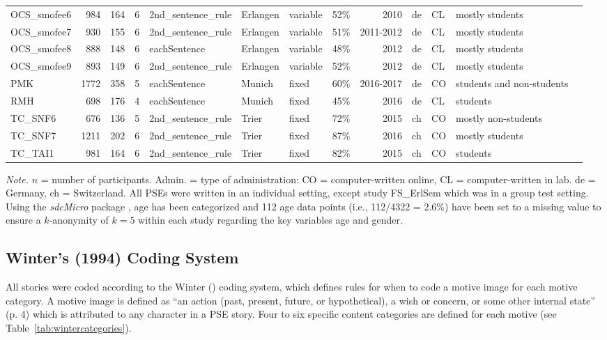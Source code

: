 \documentclass[man,a4paper,mask]{apa6}\usepackage[]{graphicx}\usepackage[]{color}
\begin{document}
\begin{table}
\begin{threeparttable}
\begin{tabularx}{\textwidth}{lrrrlllrrllll}
  OCS\_smofee6 & 984 & 164 &   6 & 2nd\_sentence\_rule & Erlangen & variable & 52\% & 2010 & de & CL & mostly students \\ 
  OCS\_smofee7 & 930 & 155 &   6 & 2nd\_sentence\_rule & Erlangen & variable & 51\% & 2011-2012 & de & CL & mostly students \\ 
  OCS\_smofee8 & 888 & 148 &   6 & eachSentence & Erlangen & variable & 48\% & 2012 & de & CL & mostly students \\ 
  OCS\_smofee9 & 893 & 149 &   6 & 2nd\_sentence\_rule & Erlangen & variable & 52\% & 2012 & de & CL & mostly students \\ 
  PMK & 1772 & 358 &   5 & eachSentence & Munich & fixed & 60\% & 2016-2017 & de & CO & students and non-students \\ 
  RMH & 698 & 176 &   4 & eachSentence & Munich & fixed & 45\% & 2016 & de & CL & students \\ 
  TC\_SNF6 & 676 & 136 &   5 & 2nd\_sentence\_rule & Trier & fixed & 72\% & 2015 & ch & CO & mostly non-students \\ 
  TC\_SNF7 & 1211 & 202 &   6 & 2nd\_sentence\_rule & Trier & fixed & 87\% & 2016 & ch & CO & mostly students \\ 
  TC\_TAI1 & 981 & 164 &   6 & 2nd\_sentence\_rule & Trier & fixed & 82\% & 2015 & ch & CO & students \\ 
   \hline


		\bottomrule
		\end{tabularx}
		\begin{tablenotes}[para,flushleft]
			{\small
			\vspace*{0.75em}
			\textit{Note.} $n$ = number of participants. Admin. = type of administration: CO = computer-written online, CL = computer-written in lab. de = Germany, ch = Switzerland. All PSEs were written in an individual setting, except study FS\_ErlSem which was in a group test setting. Using the \emph{sdcMicro} package \parencite{templ_StatisticalDisclosureControl_2015}, age has been categorized and 112 age data points (i.e., 112/4322 = 2.6\%) have been set to a missing value to ensure a $k$-anonymity of $k=5$ within each study regarding the key variables age and gender.}
    \end{tablenotes}
\end{threeparttable}
\end{table}


\subsection{Winter's (1994) Coding System}
All stories were coded according to the Winter (\citeyear{winter_ManualScoringMotive_1994}) coding system, which defines rules for when to code a motive image for each motive category. A motive image is defined as ``an action (past, present, future, or hypothetical), a wish or concern, or some other internal state'' (p. 4) which is attributed to any character in a PSE story. Four to six specific content categories are defined for each motive (see Table~\ref{tab:wintercategories}). 
\end{document}
